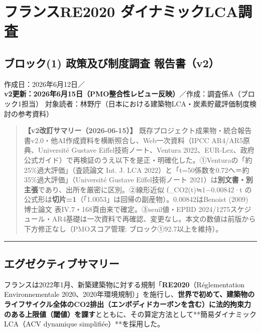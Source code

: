 \documentclass[11pt]{article}
\begin{document}
\hypertarget{ux30d5ux30e9ux30f3ux30b9re2020-ux30c0ux30a4ux30caux30dfux30c3ux30aflcaux8abfux67fb}{%
\section{フランスRE2020
ダイナミックLCA調査}\label{ux30d5ux30e9ux30f3ux30b9re2020-ux30c0ux30a4ux30caux30dfux30c3ux30aflcaux8abfux67fb}}

\hypertarget{ux30d6ux30edux30c3ux30af1-ux653fux7b56ux53caux3073ux5236ux5ea6ux8abfux67fb-ux5831ux544aux66f8v2}{%
\subsection{ブロック(1) 政策及び制度調査
報告書（v2）}\label{ux30d6ux30edux30c3ux30af1-ux653fux7b56ux53caux3073ux5236ux5ea6ux8abfux67fb-ux5831ux544aux66f8v2}}

作成日：2026年6月12日／\textbf{v2更新：2026年6月15日（PMO整合性レビュー反映）}／作成：調査係A（ブロック1担当）
対象読者：林野庁（日本における建築物LCA・炭素貯蔵評価制度検討の参考資料）

\begin{quote}
\textbf{【v2改訂サマリー（2026-06-15）】}
既存プロジェクト成果物・統合報告書v2.0・他AI作成資料を横断照合し、Web一次資料（IPCC
AR4/AR5原典、Université Gustave Eiffel技術ノート、Ventura
2022、EUR-Lex、政府公式ガイド）で再検証のうえ以下を是正・明確化した。①Venturaの「約25\%過大評価」（査読論文
Int. J. LCA 2022）と「t=50係数を0.72へ＝約35\%過大評価」（Université
Gustave Eiffel技術ノート
2021）は\textbf{別文書・別主張}であり、出所を厳密に区別。②線形近似
f\_CO2(t)≒1−0.00842·t
の公式形は\textbf{切片=1}（「1.0053」は回帰の副産物）。0.00842はBenoist
(2009) 博士論文 表IV.7・168頁由来で確定。③seuil値・EPBD
2024/1275スケジュール・AR4基礎は一次資料で再確認、変更なし。本文の数値は前版から下方修正なし（PMOスコア管理:
ブロック①92.7以上を維持）。
\end{quote}

\begin{center}\rule{0.5\linewidth}{0.5pt}\end{center}

\hypertarget{ux30a8ux30b0ux30bcux30afux30c6ux30a3ux30d6ux30b5ux30deux30eaux30fc}{%
\subsection{エグゼクティブサマリー}\label{ux30a8ux30b0ux30bcux30afux30c6ux30a3ux30d6ux30b5ux30deux30eaux30fc}}

フランスは2022年1月、新築建築物に対する規制「\textbf{RE2020}（Réglementation
Environnementale
2020、2020年環境規制）」を施行し、\textbf{世界で初めて、建築物のライフサイクル全体のCO2排出（エンボディドカーボンを含む）に法的拘束力のある上限値（閾値）を課す}とともに、その算定方法として**簡易ダイナミックLCA（ACV
dynamique simplifiée）**を採用した。
\end{document}
